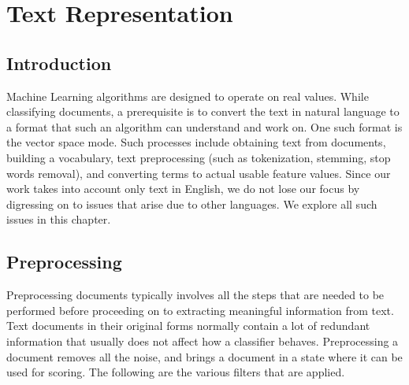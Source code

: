 \chapter{Text Representation}
\label{chapter:Text Representation}

\section{Introduction}
Machine Learning algorithms are designed to operate on real values. While classifying documents, a prerequisite is to convert the text in natural language to a format that such an algorithm can understand and work on. One such format is the vector space mode. Such processes include obtaining text from documents, building a vocabulary, text preprocessing (such as tokenization, stemming, stop words removal), and converting terms to actual usable feature values. Since our work takes into account only text in English, we do not lose our focus by digressing on to issues that arise due to other languages. We explore all such issues in this chapter.

\section{Preprocessing}
Preprocessing documents typically involves all the steps that are needed to be performed before proceeding on to extracting meaningful information from text. Text documents in their original forms normally contain a lot of redundant information that usually does not affect how a classifier behaves. Preprocessing a document removes all the noise, and brings a document in a state where it can be used for scoring. The following are the various filters that are applied.


